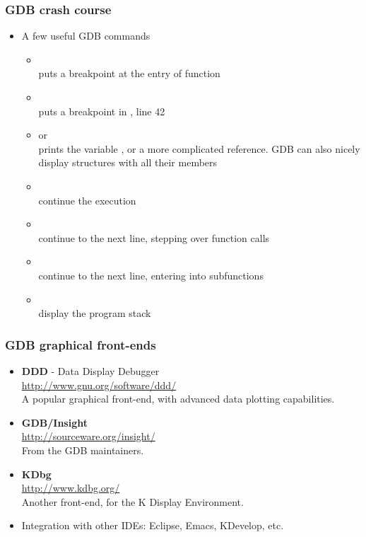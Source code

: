 \begin{frame}
  \frametitle{GDB crash course}
  \begin{itemize}
  \item A few useful GDB commands
    \begin{itemize}
    \item {}\\
      puts a breakpoint at the entry of function 
    \item {}\\
      puts a breakpoint in , line 42
    \item {} or \\
      prints the variable , or a more complicated reference. GDB
      can also nicely display structures with all their members
    \item {}\\
      continue the execution
    \item {}\\
      continue to the next line, stepping over function calls
    \item {}\\
      continue to the next line, entering into subfunctions
    \item {}\\
      display the program stack
    \end{itemize}
  \end{itemize}
\end{frame}

\begin{frame}
  \frametitle{GDB graphical front-ends}
  \begin{itemize}
  \item {\bf DDD} - Data Display Debugger\\
    \url{http://www.gnu.org/software/ddd/}\\
    A popular graphical front-end, with advanced data plotting
    capabilities.
  \item {\bf GDB/Insight}\\
    \url{http://sourceware.org/insight/}\\
    From the GDB maintainers.
  \item {\bf KDbg}\\
    \url{http://www.kdbg.org/}\\
    Another front-end, for the K Display Environment.
  \item Integration with other IDEs: Eclipse, Emacs, KDevelop, etc.\\
  \end{itemize}
\end{frame}

